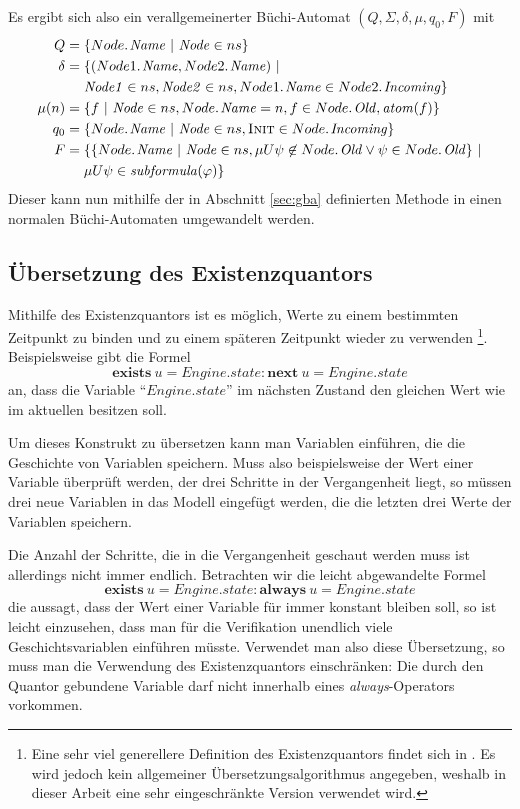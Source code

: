 Es ergibt sich also ein verallgemeinerter Büchi-Automat $(Q,\Sigma,\delta,\mu,q_0,F)$ mit
\begin{align*}
  Q = {}& \{ \attrib{Node}{Name}\ |\ \id{Node}\in ns \}\\
  \delta = {} & \{ (\attrib{Node1}{Name},\attrib{Node2}{Name})\ |\\
          & \id{Node1}\in ns,\id{Node2}\in ns, \attrib{Node1}{Name}\in \attrib{Node2}{Incoming}\}\\
  \mu(n) = {} & \{ f\ |\ \id{Node}\in ns, \attrib{Node}{Name} = n, f\in\attrib{Node}{Old}, \id{atom}(f) \}\\
  q_0 = {} & \{ \attrib{Node}{Name}\ |\ \id{Node}\in ns, \const{Init}\in\attrib{Node}{Incoming} \}\\
  F = {} & \{ \{ \attrib{Node}{Name}\ |\ \id{Node}\in ns, \mu U\psi \not\in \attrib{Node}{Old}\lor \psi\in\attrib{Node}{Old} \}\ |\\
     & \mu U\psi\in\id{subformula}(\varphi) \}
\end{align*}
Dieser kann nun mithilfe der in Abschnitt \ref{sec:gba} definierten Methode in einen normalen Büchi-Automaten umgewandelt werden.

\subsection{Übersetzung des Existenzquantors}
Mithilfe des Existenzquantors ist es möglich, Werte zu einem bestimmten Zeitpunkt zu binden und zu einem späteren Zeitpunkt wieder zu verwenden
\footnote{Eine sehr viel generellere Definition des Existenzquantors findet sich in \cite{exists_quantor}.
  Es wird jedoch kein allgemeiner Übersetzungsalgorithmus angegeben, weshalb in dieser Arbeit eine sehr eingeschränkte Version verwendet wird.
}.
Beispielsweise gibt die Formel
\[ \textbf{exists}\ u = \mathit{Engine}.\mathit{state} : \textbf{next}\ u = \mathit{Engine}.\mathit{state} \]
an, dass die Variable "`$\mathit{Engine}.\mathit{state}$"' im nächsten Zustand den gleichen Wert wie im aktuellen besitzen soll.

Um dieses Konstrukt zu übersetzen kann man Variablen einführen, die die Geschichte von Variablen speichern.
Muss also beispielsweise der Wert einer Variable überprüft werden, der drei Schritte in der Vergangenheit liegt, so müssen drei neue Variablen in das Modell eingefügt werden, die die letzten drei Werte der Variablen speichern.

Die Anzahl der Schritte, die in die Vergangenheit geschaut werden muss ist allerdings nicht immer endlich.
Betrachten wir die leicht abgewandelte Formel
\[ \textbf{exists}\ u = \mathit{Engine}.\mathit{state} : \textbf{always}\ u = \mathit{Engine}.\mathit{state} \]
die aussagt, dass der Wert einer Variable für immer konstant bleiben soll, so ist leicht einzusehen, dass man für die Verifikation unendlich viele Geschichtsvariablen einführen müsste.
Verwendet man also diese Übersetzung, so muss man die Verwendung des Existenzquantors einschränken:
Die durch den Quantor gebundene Variable darf nicht innerhalb eines \emph{always}-Operators vorkommen.

